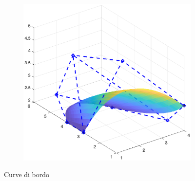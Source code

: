 \documentclass[a4paper, 12pt]{article}
\begin{document}
\begin{figure}[]
\begin{subfigure}[b]{0.3\textwidth}
      \label{fig:border_curve_no_surf}
  \end{subfigure}
  \begin{subfigure}[b]{0.3\textwidth}
      \includegraphics[width=\textwidth]{figure/surf_no_bord.eps}
      \label{fig:surf_no_bord}
  \end{subfigure}
  \caption{Curve di bordo}\label{fig:bezier_border_curve}
\end{figure}

\end{document}
